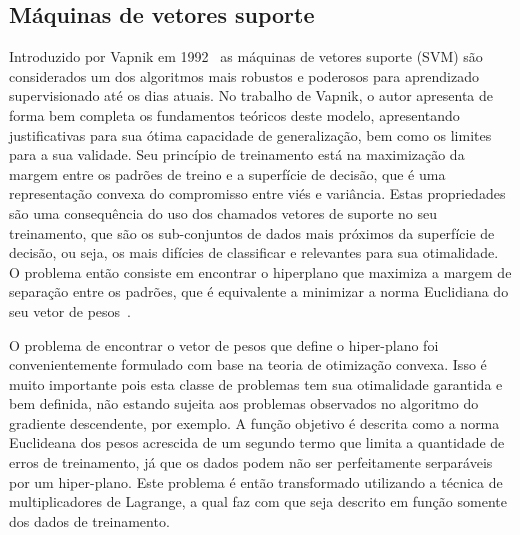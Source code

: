 \documentclass[conference]{IEEEtran}
\begin{document}
	
	\subsection{Máquinas de vetores suporte}
	Introduzido por Vapnik em 1992~\cite{boser1992training} as máquinas de vetores suporte (SVM) são considerados um dos algoritmos mais robustos e poderosos para aprendizado supervisionado até os dias atuais. No trabalho de Vapnik, o autor apresenta de forma bem completa os fundamentos teóricos deste modelo, apresentando justificativas para sua ótima capacidade de generalização, bem como os limites para a sua validade. Seu princípio de treinamento está na maximização da margem entre os padrões de treino e a superfície de decisão, que é uma representação convexa do compromisso entre viés e variância.
	Estas propriedades são uma consequência do uso dos chamados vetores de suporte no seu treinamento, que são os sub-conjuntos de dados mais próximos da superfície de decisão, ou seja, os mais difícies de classificar e relevantes para sua otimalidade. O problema então consiste em encontrar o hiperplano que maximiza a margem de separação entre os padrões, que é equivalente a minimizar a norma Euclidiana do seu vetor de pesos~\cite{haykin2007neural}. 
	
%	
	
	O problema de encontrar o vetor de pesos que define o hiper-plano foi convenientemente formulado com base na teoria de otimização convexa. Isso é muito importante pois esta classe de problemas tem sua otimalidade garantida e bem definida, não estando sujeita aos problemas observados no algoritmo do gradiente descendente, por exemplo. A função objetivo é descrita como a norma Euclideana dos pesos  acrescida de um segundo termo que limita a quantidade de erros de treinamento, já que os dados podem não ser perfeitamente serparáveis por um hiper-plano. Este problema é então transformado utilizando a técnica de multiplicadores de Lagrange, a qual faz com que seja descrito em função somente dos dados de treinamento.
	
\end{document}
